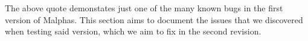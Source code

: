 \vspace{\baselineskip}
The above quote demonstates just one of the many known bugs in the first version of Malphas.
This section aims to document the issues that we discovered when testing said version, which we aim to fix in the second revision.
